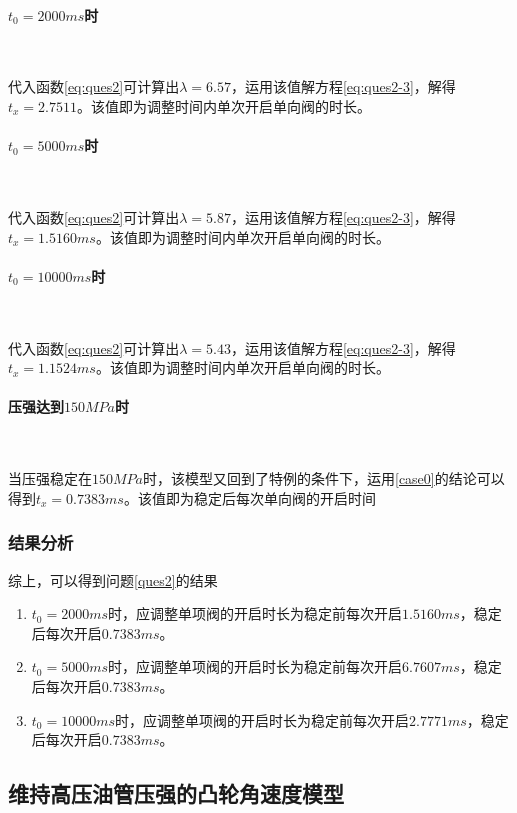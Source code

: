 \documentclass[withoutpreface,bwprint]{cumcmthesis} %
\begin{document}
\paragraph{$t_{0}=2000ms$时}~{}

代入函数\cref{eq:ques2}可计算出$\lambda=6.57$，运用该值解方程\cref{eq:ques2-3}，解得$t_{x} =2.7511$。该值即为调整时间内单次开启单向阀的时长。

\paragraph{$t_{0}=5000ms$时}~{}

代入函数\cref{eq:ques2}可计算出$\lambda=5.87$，运用该值解方程\cref{eq:ques2-3}，解得$t_{x} = 1.5160ms$。该值即为调整时间内单次开启单向阀的时长。
\paragraph{$t_{0}=10000ms$时}~{}

代入函数\cref{eq:ques2}可计算出$\lambda=5.43$，运用该值解方程\cref{eq:ques2-3}，解得$t_{x} = 1.1524ms$。该值即为调整时间内单次开启单向阀的时长。

\paragraph{压强达到$150MPa$时}~{}

当压强稳定在$150MPa$时，该模型又回到了特例的条件下，运用\ref{case0}的结论可以得到$t_{x} = 0.7383ms$。该值即为稳定后每次单向阀的开启时间

\subsubsection{结果分析}

综上，可以得到问题\ref{ques2}的结果
\begin{enumerate}
	\item $t_{0}=2000ms$时，应调整单项阀的开启时长为稳定前每次开启$1.5160ms$，稳定后每次开启$ 0.7383ms$。
	\item $t_{0}=5000ms$时，应调整单项阀的开启时长为稳定前每次开启$6.7607ms$，稳定后每次开启$0.7383ms$。
	\item$t_{0}=10000ms$时，应调整单项阀的开启时长为稳定前每次开启$2.7771ms$，稳定后每次开启$0.7383ms$。
\end{enumerate}
\subsection{维持高压油管压强的凸轮角速度模型}\label{model2}
\end{document}
